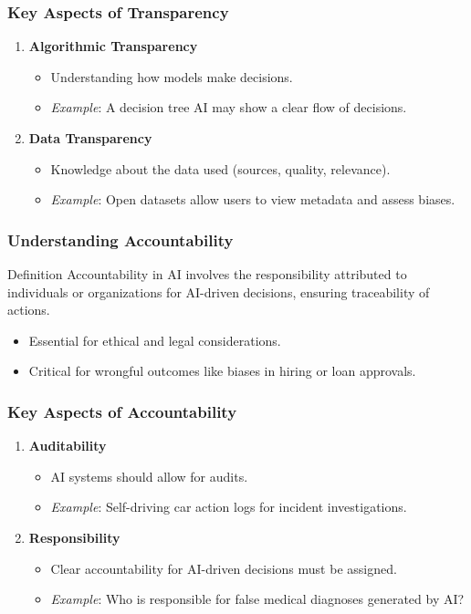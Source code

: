 \documentclass{beamer}
\begin{document}
\begin{frame}[fragile]
    \frametitle{Key Aspects of Transparency}
    \begin{enumerate}
        \item \textbf{Algorithmic Transparency}
            \begin{itemize}
                \item Understanding how models make decisions.
                \item \textit{Example}: A decision tree AI may show a clear flow of decisions.
            \end{itemize}
        \item \textbf{Data Transparency}
            \begin{itemize}
                \item Knowledge about the data used (sources, quality, relevance).
                \item \textit{Example}: Open datasets allow users to view metadata and assess biases.
            \end{itemize}
    \end{enumerate}
\end{frame}

\begin{frame}[fragile]
    \frametitle{Understanding Accountability}
    \begin{block}{Definition}
        Accountability in AI involves the responsibility attributed to individuals or organizations for AI-driven decisions, ensuring traceability of actions.
    \end{block}
    \begin{itemize}
        \item Essential for ethical and legal considerations.
        \item Critical for wrongful outcomes like biases in hiring or loan approvals.
    \end{itemize}
\end{frame}

\begin{frame}[fragile]
    \frametitle{Key Aspects of Accountability}
    \begin{enumerate}
        \item \textbf{Auditability}
            \begin{itemize}
                \item AI systems should allow for audits.
                \item \textit{Example}: Self-driving car action logs for incident investigations.
            \end{itemize}
        \item \textbf{Responsibility}
            \begin{itemize}
                \item Clear accountability for AI-driven decisions must be assigned.
                \item \textit{Example}: Who is responsible for false medical diagnoses generated by AI?
            \end{itemize}
    \end{enumerate}
\end{frame}
\end{document}
